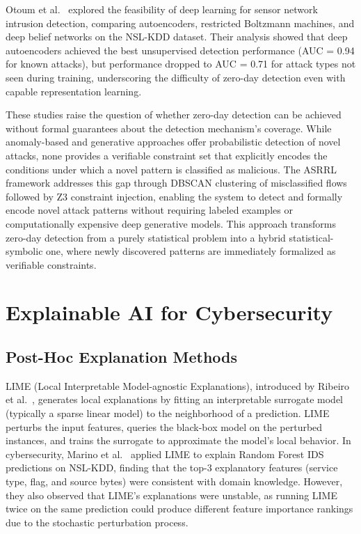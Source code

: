 \documentclass[12pt, letterpaper, oneside]{report}
\newcommand{\ASRRL}{\textsc{ASRRL}}
\begin{document}
Otoum et al.~\cite{otoum2019} explored the feasibility of deep learning for sensor network intrusion detection, comparing autoencoders, restricted Boltzmann machines, and deep belief networks on the NSL-KDD dataset. Their analysis showed that deep autoencoders achieved the best unsupervised detection performance (AUC = 0.94 for known attacks), but performance dropped to AUC = 0.71 for attack types not seen during training, underscoring the difficulty of zero-day detection even with capable representation learning.

These studies raise the question of whether zero-day detection can be achieved without formal guarantees about the detection mechanism's coverage. While anomaly-based and generative approaches offer probabilistic detection of novel attacks, none provides a verifiable constraint set that explicitly encodes the conditions under which a novel pattern is classified as malicious. The \ASRRL{} framework addresses this gap through DBSCAN clustering of misclassified flows followed by Z3 constraint injection, enabling the system to detect and formally encode novel attack patterns without requiring labeled examples or computationally expensive deep generative models. This approach transforms zero-day detection from a purely statistical problem into a hybrid statistical-symbolic one, where newly discovered patterns are immediately formalized as verifiable constraints.


\section{Explainable AI for Cybersecurity}
\label{sec:lit_xai}

\subsection{Post-Hoc Explanation Methods}

LIME (Local Interpretable Model-agnostic Explanations), introduced by Ribeiro et al.~\cite{ribeiro2016}, generates local explanations by fitting an interpretable surrogate model (typically a sparse linear model) to the neighborhood of a prediction. LIME perturbs the input features, queries the black-box model on the perturbed instances, and trains the surrogate to approximate the model's local behavior. In cybersecurity, Marino et al.~\cite{marino2018} applied LIME to explain Random Forest IDS predictions on NSL-KDD, finding that the top-3 explanatory features (service type, flag, and source bytes) were consistent with domain knowledge. However, they also observed that LIME's explanations were unstable, as running LIME twice on the same prediction could produce different feature importance rankings due to the stochastic perturbation process.
\end{document}

